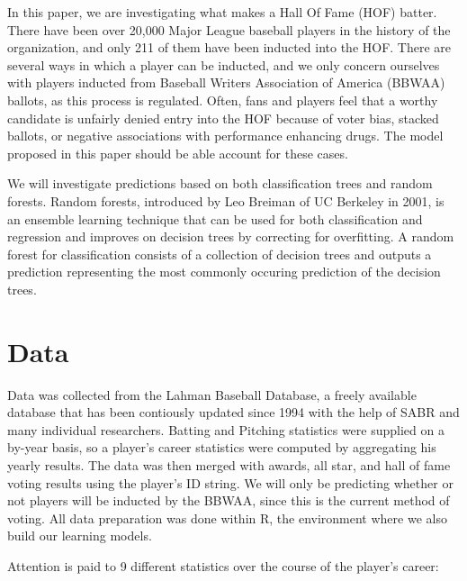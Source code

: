 \documentclass[preprint,12pt]{elsarticle}
\begin{document}
In this paper, we are investigating what makes a Hall Of Fame (HOF) batter. There have been over 20,000 Major League baseball players in the history of the organization, and only 211 of them have been inducted into the HOF. There are several ways in which a player can be inducted, and we only concern ourselves with players inducted from Baseball Writers Association of America (BBWAA) ballots, as this process is regulated. Often, fans and players feel that a worthy candidate is unfairly denied entry into the HOF because of voter bias, stacked ballots, or negative associations with performance enhancing drugs. The model proposed in this paper should be able account for these cases.

We will investigate predictions based on both classification trees and random forests. Random forests, introduced by Leo Breiman of UC Berkeley in 2001, is an ensemble learning technique that can be used for both classification and regression and improves on decision trees by correcting for overfitting. A random forest for classification consists of a collection of decision trees and outputs a prediction representing the most commonly occuring prediction of the decision trees.

\section{Data}
\label{data}
Data was collected from the Lahman Baseball Database, a freely available database that has been contiously updated since 1994 with the help of SABR and many individual researchers. Batting and Pitching statistics were supplied on a by-year basis, so a player's career statistics were computed by aggregating his yearly results. The data was then merged with awards, all star, and hall of fame voting results using the player's ID string. We will only be predicting whether or not players will be inducted by the BBWAA, since this is the current method of voting. All data preparation was done within R, the environment where we also build our learning models. 

Attention is paid to 9 different statistics over the course of the player's career:
\end{document}
